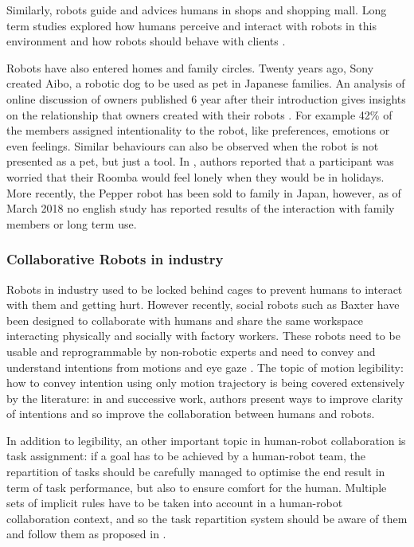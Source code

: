 	Similarly, robots guide and advices humans in shops and shopping mall. Long term studies explored how humans perceive and interact with robots in this environment \citep{kanda2009affective} and how robots should behave with clients \citep{kanda2008will}.

    Robots have also entered homes and family circles. Twenty years ago, Sony created Aibo, a robotic dog to be used as pet in Japanese families. An analysis of online discussion of owners published 6 year after their introduction gives insights on the relationship that owners created with their robots \citep{friedman2003hardware}. For example 42\% of the members assigned intentionality to the robot, like preferences, emotions or even feelings. Similar behaviours can also be observed when the robot is not presented as a pet, but just a tool. In \cite{fink2013living}, authors reported that a participant was worried that their Roomba would feel lonely when they would be in holidays. More recently, the Pepper robot has been sold to family in Japan, however, as of March 2018 no english study has reported results of the interaction with family members or long term use.

\subsubsection{Collaborative Robots in industry}
	Robots in industry used to be locked behind cages to prevent humans to interact with them and getting hurt. However recently, social robots such as Baxter \citep{guizzo2012rethink} have been designed to collaborate with humans and share the same workspace interacting physically and socially with factory workers. These robots need to be usable and reprogrammable by non-robotic experts and need to convey and understand intentions from motions and eye gaze \citep{bauer2008human}. The topic of motion legibility: how to convey intention using only motion trajectory is being covered extensively by the literature: in \citet{dragan2013legibility} and successive work, authors present ways to improve clarity of intentions and so improve the collaboration between humans and robots.

    In addition to legibility, an other important topic in human-robot collaboration is task assignment: if a goal has to be achieved by a human-robot team, the repartition of tasks should be carefully managed to  optimise the end result in term of task performance, but also to ensure comfort for the human. Multiple sets of implicit rules have to be taken into account in a human-robot collaboration context, and so the task repartition system should be aware of them and follow them as proposed in \cite{montreuil2007planning}.
	
